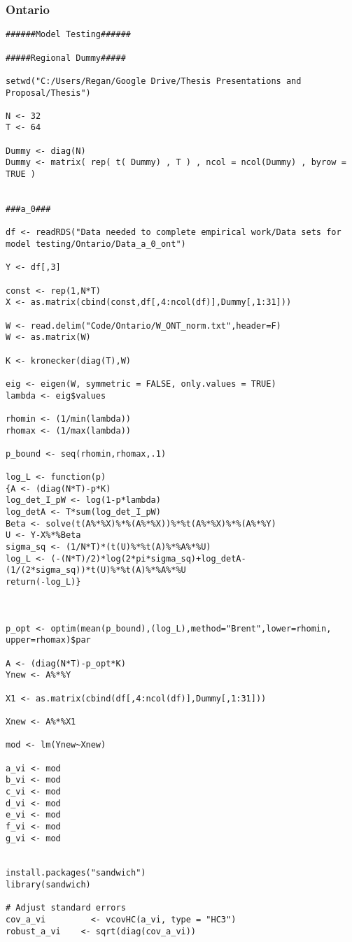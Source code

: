 \subsubsection{Ontario}

\begin{lstlisting}
######Model Testing######

#####Regional Dummy#####

setwd("C:/Users/Regan/Google Drive/Thesis Presentations and Proposal/Thesis")

N <- 32
T <- 64

Dummy <- diag(N)
Dummy <- matrix( rep( t( Dummy) , T ) , ncol = ncol(Dummy) , byrow = TRUE )


###a_0###

df <- readRDS("Data needed to complete empirical work/Data sets for model testing/Ontario/Data_a_0_ont")

Y <- df[,3]

const <- rep(1,N*T)
X <- as.matrix(cbind(const,df[,4:ncol(df)],Dummy[,1:31]))

W <- read.delim("Code/Ontario/W_ONT_norm.txt",header=F)
W <- as.matrix(W)

K <- kronecker(diag(T),W)

eig <- eigen(W, symmetric = FALSE, only.values = TRUE)
lambda <- eig$values

rhomin <- (1/min(lambda))
rhomax <- (1/max(lambda))

p_bound <- seq(rhomin,rhomax,.1)

log_L <- function(p)
{A <- (diag(N*T)-p*K)
log_det_I_pW <- log(1-p*lambda)
log_detA <- T*sum(log_det_I_pW)
Beta <- solve(t(A%*%X)%*%(A%*%X))%*%t(A%*%X)%*%(A%*%Y)
U <- Y-X%*%Beta
sigma_sq <- (1/N*T)*(t(U)%*%t(A)%*%A%*%U)
log_L <- (-(N*T)/2)*log(2*pi*sigma_sq)+log_detA-(1/(2*sigma_sq))*t(U)%*%t(A)%*%A%*%U
return(-log_L)}



p_opt <- optim(mean(p_bound),(log_L),method="Brent",lower=rhomin, upper=rhomax)$par

A <- (diag(N*T)-p_opt*K)
Ynew <- A%*%Y

X1 <- as.matrix(cbind(df[,4:ncol(df)],Dummy[,1:31]))

Xnew <- A%*%X1

mod <- lm(Ynew~Xnew)

a_vi <- mod
b_vi <- mod
c_vi <- mod
d_vi <- mod
e_vi <- mod
f_vi <- mod
g_vi <- mod


install.packages("sandwich")
library(sandwich)

# Adjust standard errors
cov_a_vi         <- vcovHC(a_vi, type = "HC3")
robust_a_vi    <- sqrt(diag(cov_a_vi))


\end{lstlisting}
